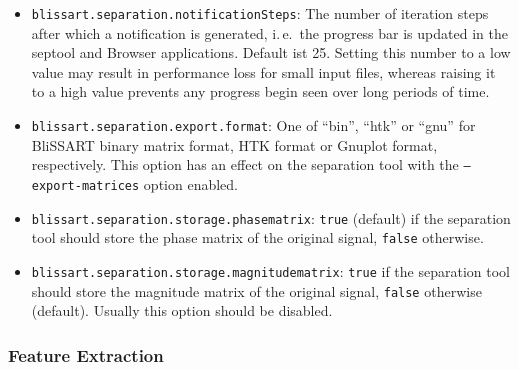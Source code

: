 \begin{itemize}
  \item {\tt blissart.separation.notificationSteps}:
        The number of iteration steps after which a notification is generated,
        i.\,e.\ the progress bar is updated in the septool and Browser
        applications. Default ist 25. Setting this number to a low value may
        result in performance loss for small input files, whereas raising it
        to a high value prevents any progress begin seen over long periods of
        time.
  \item {\tt blissart.separation.export.format}:
        One of ``bin'', ``htk'' or ``gnu'' for BliSSART binary matrix format,
        HTK format or Gnuplot format, respectively. This option has an effect
        on the separation tool with the {\tt --export-matrices} option enabled.
  \item {\tt blissart.separation.storage.phasematrix}:
        {\tt true} (default) if the separation tool should store the phase
        matrix of the original signal, {\tt false} otherwise.
  \item {\tt blissart.separation.storage.magnitudematrix}:
        {\tt true} if the separation tool should store the magnitude
        matrix of the original signal, {\tt false} otherwise (default).
        Usually this option should be disabled.
\end{itemize}


\subsubsection{Feature Extraction}
\label{section:ConfigFileFex}

